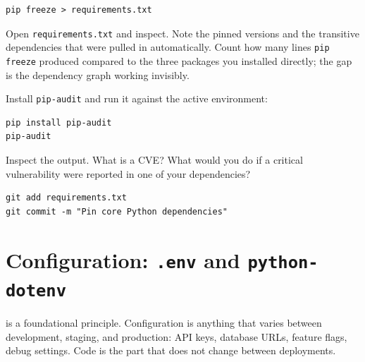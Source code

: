 \begin{verbatim}
pip freeze > requirements.txt
\end{verbatim}

Open \texttt{requirements.txt} and inspect.
Note the pinned versions and the transitive dependencies that were pulled
in automatically.
Count how many lines \texttt{pip freeze} produced compared to the three
packages you installed directly; the gap is the dependency graph
working invisibly.


Install \texttt{pip-audit} and run it against the active environment:

\begin{verbatim}
pip install pip-audit
pip-audit
\end{verbatim}

Inspect the output.
What is a CVE?
What would you do if a critical vulnerability were reported in one of
your dependencies?



\begin{verbatim}
git add requirements.txt
git commit -m "Pin core Python dependencies"
\end{verbatim}



\newpage
\section{Configuration: \texttt{.env} and \texttt{python-dotenv}}

 is a foundational principle.
Configuration is anything that varies between development, staging, and
production: API keys, database URLs, feature flags, debug settings.
Code is the part that does not change between deployments.

